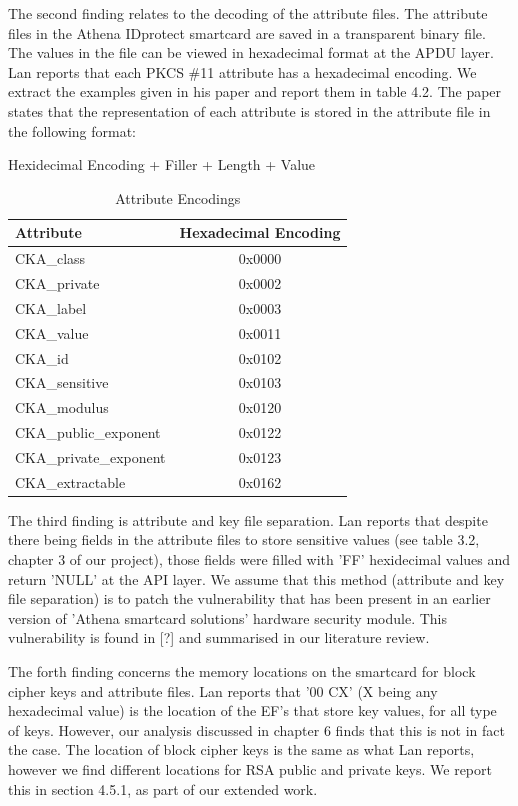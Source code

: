 \documentclass[bsc,frontabs,twoside,singlespacing,parskip,deptreport]{infthesis}     %
\begin{document}
The second finding relates to the decoding of the attribute files. The attribute files in the Athena IDprotect smartcard are saved in a transparent binary file. The values in the file can be viewed in hexadecimal format at the APDU layer. Lan reports that each PKCS \#11 attribute has a hexadecimal encoding. We extract the examples given in his paper and report them in table 4.2. The paper states that the representation of each attribute is stored in the attribute file in the following format:

\begin{center}
Hexidecimal Encoding + Filler + Length + Value
\end{center}

\begin{table}[H]
\begin{tabular}{|l|c|}
\hline
Attribute & Hexadecimal Encoding\\
\hline
CKA\_class & 0x0000\\
\hline
CKA\_private & 0x0002\\
\hline
CKA\_label & 0x0003\\
\hline
CKA\_value & 0x0011\\
\hline
CKA\_id & 0x0102\\
\hline
CKA\_sensitive & 0x0103\\
\hline
CKA\_modulus & 0x0120\\
\hline
CKA\_public\_exponent & 0x0122\\
\hline
CKA\_private\_exponent & 0x0123\\
\hline
CKA\_extractable & 0x0162\\
\hline
\end{tabular}
\caption{Attribute Encodings}
\end{table}

The third finding is attribute and key file separation. Lan reports that despite there being fields in the attribute files to store sensitive values (see table 3.2, chapter 3 of our project), those fields were filled with 'FF' hexidecimal values and return 'NULL' at the API layer. We assume that this method (attribute and key file separation) is to patch the vulnerability that has been present in an earlier version of 'Athena smartcard solutions' hardware security module. This vulnerability is found in [?] and summarised in our literature review.

The forth finding concerns the memory locations on the smartcard for block cipher keys and attribute files. Lan reports that '00 CX' (X being any hexadecimal value) is the location of the EF's that store key values, for all type of keys. However, our analysis discussed in chapter 6 finds that this is not in fact the case. The location of block cipher keys is the same as what Lan reports, however we find different locations for RSA public and private keys. We report this in section 4.5.1, as part of our extended work.
\end{document}

